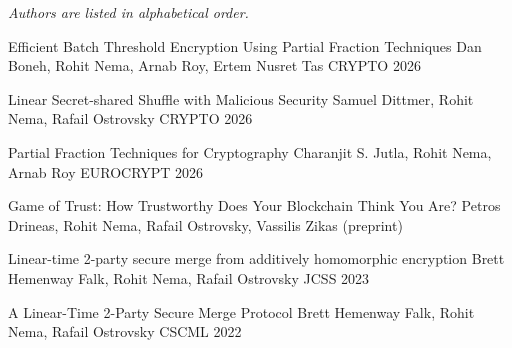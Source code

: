 
\begin{cvparagraph}
  \emph{Authors are listed in alphabetical order.}
\end{cvparagraph}

\begin{cventries}

  \cvpublication
    {Efficient Batch Threshold Encryption Using Partial Fraction Techniques}
    {Dan Boneh, Rohit Nema, Arnab Roy, Ertem Nusret Tas}
    {CRYPTO 2026}
    {}

  \cvpublication
    {Linear Secret-shared Shuffle with Malicious Security}
    {Samuel Dittmer, Rohit Nema, Rafail Ostrovsky}
    {CRYPTO 2026}
    {}

  \cvpublication
    {Partial Fraction Techniques for Cryptography}
    {Charanjit S. Jutla, Rohit Nema, Arnab Roy}
    {EUROCRYPT 2026}
    {}

  \cvpublication
    {Game of Trust: How Trustworthy Does Your Blockchain Think You Are?}
    {Petros Drineas, Rohit Nema, Rafail Ostrovsky, Vassilis Zikas}
    {(preprint)}
    {}

  \cvpublication
    {Linear-time 2-party secure merge from additively homomorphic encryption}
    {Brett Hemenway Falk, Rohit Nema, Rafail Ostrovsky}
    {JCSS 2023}
    {}

  \cvpublication
    {A Linear-Time 2-Party Secure Merge Protocol}
    {Brett Hemenway Falk, Rohit Nema, Rafail Ostrovsky}
    {CSCML 2022}
    {}

\end{cventries}
